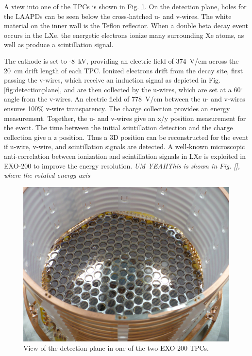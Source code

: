A view into one of the TPCs is shown in Fig. \ref{fig:tpcphoto}.  On the detection plane, holes for the LAAPDs can be seen below the cross-hatched u- and v-wires.  The white material on the inner wall is the Teflon reflector.  When a double beta decay event occurs in the LXe, the energetic electrons ionize many surrounding Xe atoms, as well as produce a scintillation signal.  %

The cathode is set to -8~kV, providing an electric field of 374~V/cm across the 20~cm drift length of each TPC.  Ionized electrons drift from the decay site, first passing the v-wires, which receive an induction signal as depicted in Fig. \ref{fig:detectionplane}, and are then collected by the u-wires, which are set at a 60$^\circ$ angle from the v-wires.  An electric field of 778~V/cm between the u- and v-wires ensures 100\% v-wire transparency.  The charge collection provides an energy measurement.  Together, the u- and v-wires give an x/y position measurement for the event.  The time between the initial scintillation detection and the charge collection give a z position.  Thus a 3D position can be reconstructed for the event if u-wire, v-wire, and scintillation signals are detected.  \cite{EXO200TwoNuLong}  A well-known microscopic anti-correlation between ionization and scintillation signals in LXe \cite{anticorr} is exploited in EXO-200 to improve the energy resolution.  \emph{\color{gray}UM YEAHThis is shown in Fig. [], where the rotated energy axis }


\begin{figure} %
	\centering
	\includegraphics[width=.9\textwidth]{figures/TPCphoto.jpeg}
	\caption{View of the detection plane in one of the two EXO-200 TPCs.}
\label{fig:tpcphoto}
\end{figure}

